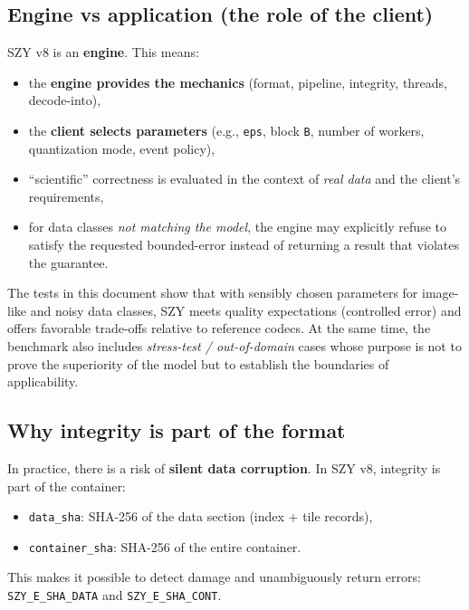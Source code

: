 \documentclass[11pt,a4paper]{article}
\begin{document}
\subsection{Engine vs application (the role of the client)}
SZY v8 is an \textbf{engine}. This means:
\begin{itemize}
  \item the \textbf{engine provides the mechanics} (format, pipeline, integrity, threads, decode-into),
  \item the \textbf{client selects parameters} (e.g., \texttt{eps}, block \texttt{B}, number of workers, quantization mode, event policy),
  \item ``scientific'' correctness is evaluated in the context of \emph{real data} and the client's requirements,
  \item for data classes \emph{not matching the model}, the engine may explicitly refuse to satisfy the requested bounded-error instead of returning a result that violates the guarantee.
\end{itemize}
The tests in this document show that with sensibly chosen parameters for image-like and noisy data classes, SZY meets quality expectations (controlled error) and offers favorable trade-offs relative to reference codecs. At the same time, the benchmark also includes \emph{stress-test / out-of-domain} cases whose purpose is not to prove the superiority of the model but to establish the boundaries of applicability.

\subsection{Why integrity is part of the format}
In practice, there is a risk of \textbf{silent data corruption}. In SZY v8, integrity is part of the container:
\begin{itemize}
  \item \texttt{data\_sha}: SHA-256 of the data section (index + tile records),
  \item \texttt{container\_sha}: SHA-256 of the entire container.
\end{itemize}
This makes it possible to detect damage and unambiguously return errors:
\texttt{SZY\_E\_SHA\_DATA} and \texttt{SZY\_E\_SHA\_CONT}.

\end{document}
